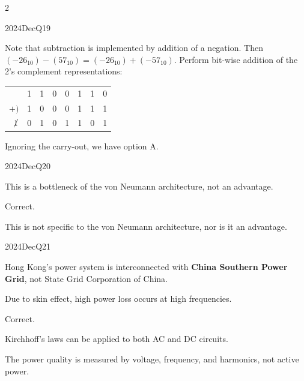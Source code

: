 \begin{multicols}{2}
\begin{qsolution}[10]{2024}{Dec}{Q19}{\tgCE \tgCETwosComplement}
    
    Note that subtraction is implemented by addition of a negation.
    Then $(-26_{10})-(57_{10})=(-26_{10})+(-57_{10})$.
    Perform bit-wise addition of the 2's complement representations:
    \begin{center}
        \begin{tabular}{rccccccc}
                            & 1 & 1 & 0 & 0 & 1 & 1 & 0 \\
            $+)$            & 1 & 0 & 0 & 0 & 1 & 1 & 1 \\ \hline
            $\cancel{1}$    & 0 & 1 & 0 & 1 & 1 & 0 & 1
        \end{tabular}
    \end{center}
    Ignoring the carry-out, we have option A.
\end{qsolution}

\begin{qsolution}{2024}{Dec}{Q20}{\tgCE \tgCEComputerOrganisation}

    \begin{enumroman}
        \item This is a bottleneck of the von Neumann architecture, not an advantage.
        \item[(ii)-(iii)] Correct.
        \item[(iv)] This is not specific to the von Neumann architecture, nor is it an advantage.
    \end{enumroman}
\end{qsolution}

\begin{qsolution}{2024}{Dec}{Q21}{\tgEE \tgEEPowerSystems}

    \begin{enumualpha}
        \item Hong Kong's power system is interconnected with \textbf{China Southern Power Grid}, not State Grid Corporation of China.
        \item Due to skin effect, high power loss occurs at high frequencies.
        \item Correct.
        \item Kirchhoff's laws can be applied to both AC and DC circuits.
        \item The power quality is measured by voltage, frequency, and harmonics, not active power.
    \end{enumualpha}
\end{qsolution}


\end{multicols}
